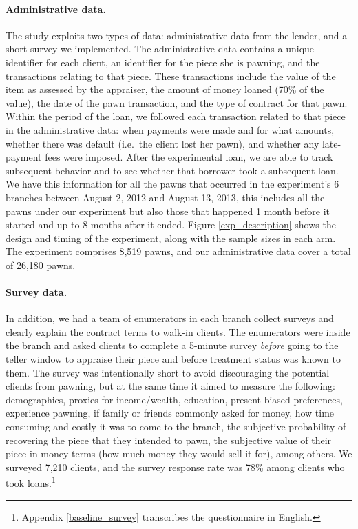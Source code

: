 \documentclass[oneside,11pt]{article}
\begin{document}
\paragraph{Administrative data.} The study exploits two types of data: administrative data from the lender, and a short survey we implemented. The administrative data contains a unique identifier for each client, an identifier for the piece she is pawning, and the transactions relating to that piece. These transactions include the value of the item as assessed by the appraiser, the amount of money loaned (70\% of the value), the date of the pawn transaction, and the type of contract for that pawn. Within the period of the loan, we followed each transaction related to that piece in the administrative data: when payments were made and for what amounts, whether there was default (i.e.\ the client lost her pawn), and whether any late-payment fees were imposed. After the experimental loan, we are able to track subsequent behavior and to see whether that borrower took a subsequent loan.  We have this information for all the pawns that occurred in the experiment's 6 branches between August 2, 2012 and August 13, 2013, this includes all the pawns under our experiment but also those that happened 1 month before it started and up to 8 months after it ended. Figure \ref{exp_description} shows the design and timing of the experiment, along with the sample sizes in each arm. The experiment comprises 8,519 pawns, and our administrative data cover a total of 26,180 pawns.

\paragraph{Survey data.} In addition, we had a team of enumerators in each branch collect surveys and clearly explain the contract terms to walk-in clients. The enumerators were inside the branch and asked clients to complete a 5-minute survey \textit{before} going to the teller window to appraise their piece and before treatment status was known to them. The survey was intentionally short to avoid discouraging the potential clients from pawning, but at the same time it aimed to measure the following: demographics, proxies for income/wealth, education, present-biased preferences, experience pawning, if family or friends commonly asked for money, how time consuming and costly it was to come to the branch, the subjective probability of recovering the piece that they intended to pawn, the subjective value of their piece in money terms (how much money they would sell it for), among others. We surveyed 7,210 clients, and the survey response rate was 78\% among clients who took loans.\footnote{Appendix \ref{baseline_survey} transcribes the questionnaire in English.} %
\end{document}
